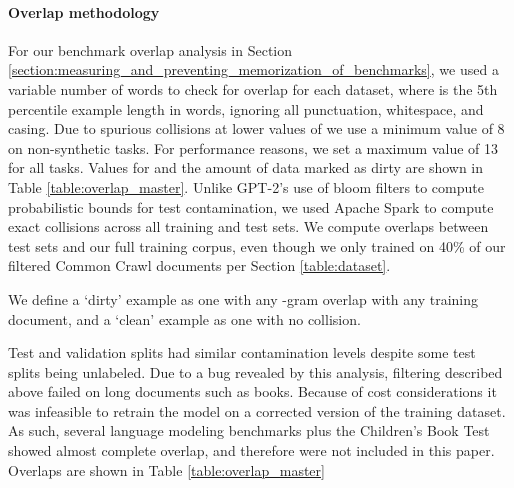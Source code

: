 \documentclass{article}
\begin{document}
\paragraph{Overlap methodology} For our benchmark overlap analysis in Section \ref{section:measuring_and_preventing_memorization_of_benchmarks}, we used a variable number of words  to check for overlap for each dataset, where  is the 5th percentile example length in words, ignoring all punctuation, whitespace, and casing. Due to spurious collisions at lower values of  we use a minimum value of 8 on non-synthetic tasks. For performance reasons, we set a maximum value of 13 for all tasks. Values for  and the amount of data marked as dirty are shown in Table \ref{table:overlap_master}. Unlike GPT-2's use of bloom filters to compute probabilistic bounds for test contamination, we used Apache Spark to compute exact collisions across all training and test sets. We compute overlaps between test sets and our full training corpus, even though we only trained on 40\% of our filtered Common Crawl documents per Section \ref{table:dataset}.

We define a `dirty' example as one with any -gram overlap with any training document, and a `clean' example as one with no collision.

Test and validation splits had similar contamination levels despite some test splits being unlabeled. Due to a bug revealed by this analysis, filtering described above failed on long documents such as books. Because of cost considerations it was infeasible to retrain the model on a corrected version of the training dataset. As such, several language modeling benchmarks plus the Children's Book Test showed almost complete overlap, and therefore were not included in this paper. Overlaps are shown in Table \ref{table:overlap_master}
\end{document}
